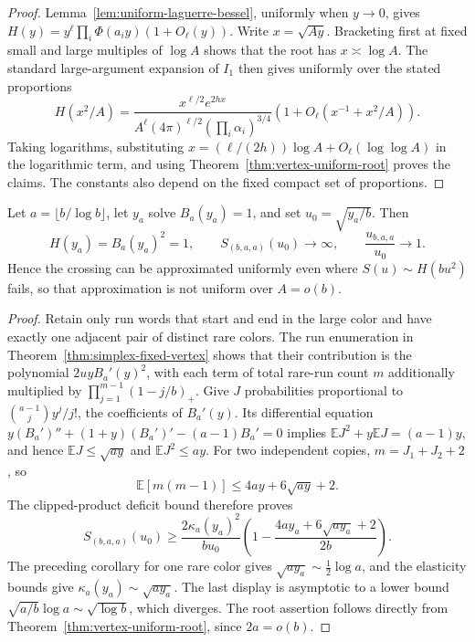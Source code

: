\begin{proof}
Lemma~\ref{lem:uniform-laguerre-bessel}, uniformly when $y\to0$, gives
$H(y)=y^\ell\prod_i\Phi(a_i y)(1+O_\ell(y))$.
Write $x=\sqrt{Ay}$. Bracketing first at fixed small and large
multiples of $\log A$ shows that the root has $x\asymp\log A$.
The standard large-argument expansion of $I_1$ then gives uniformly
over the stated proportions
\[
 H(x^2/A)=
 \frac{x^{\ell/2}e^{2hx}}
 {A^\ell(4\pi)^{\ell/2}(\prod_i\alpha_i)^{3/4}}
 \left(1+O_\ell(x^{-1}+x^2/A)\right).
\]
Taking logarithms, substituting
$x=(\ell/(2h))\log A+O_\ell(\log\log A)$ in the logarithmic term,
and using Theorem~\ref{thm:vertex-uniform-root} proves the claims.
The constants also depend on the fixed compact set of proportions.
\end{proof}

\begin{proposition}
\label{prop:vertex-probability-failure}
Let $a=\lfloor b/\log b\rfloor$, let $y_a$ solve $B_a(y_a)=1$,
and set $u_0=\sqrt{y_a/b}$. Then
\[
 H(y_a)=B_a(y_a)^2=1,\qquad
 S_{(b,a,a)}(u_0)\longrightarrow\infty,
 \qquad \frac{u_{b,a,a}}{u_0}\longrightarrow1.
\]
Hence the crossing can be approximated uniformly even where
$S(u)\sim H(bu^2)$ fails, so that approximation is not uniform over
$A=o(b)$.
\end{proposition}

\begin{proof}
Retain only run words that start and end in the large color and have
exactly one adjacent pair of distinct rare colors. The run enumeration
in Theorem~\ref{thm:simplex-fixed-vertex} shows that their contribution
is the polynomial $2uyB_a'(y)^2$, with each term of total rare-run
count $m$ additionally multiplied by
$\prod_{j=1}^{m-1}(1-j/b)_+$.
Give $J$ probabilities proportional to
$\binom{a-1}{j}y^j/j!$, the coefficients of $B_a'(y)$.
Its differential equation
$y(B_a')''+(1+y)(B_a')'-(a-1)B_a'=0$ implies
$\mathbb E J^2+y\mathbb E J=(a-1)y$, and hence
$\mathbb E J\le\sqrt{ay}$ and $\mathbb E J^2\le ay$.
For two independent copies, $m=J_1+J_2+2$, so
\[
 \mathbb E[m(m-1)]\le4ay+6\sqrt{ay}+2.
\]
The clipped-product deficit bound therefore proves
\[
 S_{(b,a,a)}(u_0)\ge
 \frac{2\kappa_a(y_a)^2}{bu_0}
 \left(1-\frac{4ay_a+6\sqrt{ay_a}+2}{2b}\right).
\]
The preceding corollary for one rare color gives
$\sqrt{ay_a}\sim\tfrac12\log a$, and the elasticity bounds give
$\kappa_a(y_a)\sim\sqrt{ay_a}$.
The last display is asymptotic to a lower bound
$\sqrt{a/b}\log a\sim\sqrt{\log b}$, which diverges.
The root assertion follows directly from
Theorem~\ref{thm:vertex-uniform-root}, since $2a=o(b)$.
\end{proof}

